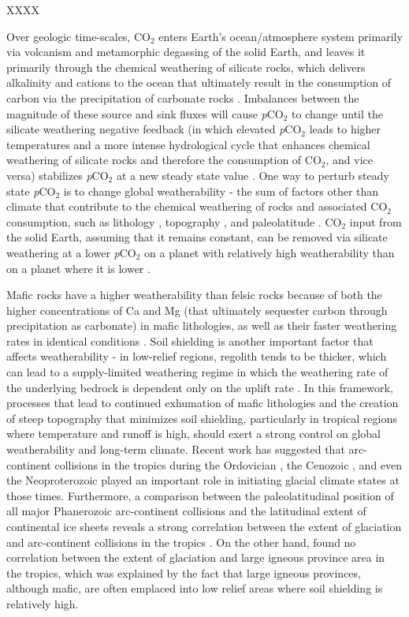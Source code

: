 \documentclass[11pt,letterpaper]{article}
\newcommand{\pCOtwo}{\textit{p}CO$_{2}$\xspace}
\newcommand{\COtwo}{CO$_{2}$\xspace}
\begin{document}
XXXX

Over geologic time-scales, \COtwo enters Earth's ocean/atmosphere system primarily via volcanism and metamorphic degassing of the solid Earth, and leaves it primarily through the chemical weathering of silicate rocks, which delivers alkalinity and cations to the ocean that ultimately result in the consumption of carbon via the precipitation of carbonate rocks \citep{Kump2000a}. Imbalances between the magnitude of these source and sink fluxes will cause \pCOtwo to change until the silicate weathering negative feedback (in which elevated \pCOtwo leads to higher temperatures and a more intense hydrological cycle that enhances chemical weathering of silicate rocks and therefore the consumption of \COtwo, and vice versa) stabilizes \pCOtwo at a new steady state value \citep{Walker1981a}. One way to perturb steady state \pCOtwo is to change global weatherability - the sum of factors other than climate that contribute to the chemical weathering of rocks and associated \COtwo consumption, such as lithology \citep{Gaillardet1999a, Dessert2003a}, topography \citep{Maher2014a, Maffre2018a}, and paleolatitude \citep{Swanson-Hysell2017a}. \COtwo input from the solid Earth, assuming that it remains constant, can be removed via silicate weathering at a lower \pCOtwo on a planet with relatively high weatherability than on a planet where it is lower \citep{Kump1997a}.

Mafic rocks have a higher weatherability than felsic rocks because of both the higher concentrations of Ca and Mg (that ultimately sequester carbon through precipitation as carbonate) in mafic lithologies, as well as their faster weathering rates in identical conditions \citep{Dessert2001a, Dessert2003a}. Soil shielding is another important factor that affects weatherability - in low-relief regions, regolith tends to be thicker, which can lead to a supply-limited weathering regime in which the weathering rate of the underlying bedrock is dependent only on the uplift rate \citep{Gabet2009a, Maher2014a}. In this framework, processes that lead to continued exhumation of mafic lithologies and the creation of steep topography that minimizes soil shielding, particularly in tropical regions where temperature and runoff is high, should exert a strong control on global weatherability and long-term climate. Recent work has suggested that arc-continent collisions in the tropics during the Ordovician \citep{Swanson-Hysell2017a}, the Cenozoic \citep{Jagoutz2016a}, and even the Neoproterozoic \citep{Park2018a} played an important role in initiating glacial climate states at those times. Furthermore, a comparison between the paleolatitudinal position of all major Phanerozoic arc-continent collisions and the latitudinal extent of continental ice sheets reveals a strong correlation between the extent of glaciation and arc-continent collisions in the tropics \citep{Macdonald2019a}. On the other hand, \citet{Park2019a} found no correlation between the extent of glaciation and large igneous province area in the tropics, which was explained by the fact that large igneous provinces, although mafic, are often emplaced into low relief areas where soil shielding is relatively high.
\end{document}

